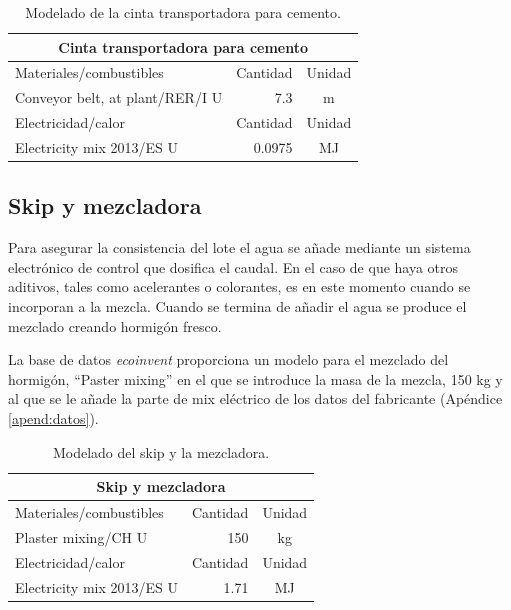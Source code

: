 \begin{table}[!htb]
\centering
\begin{tabular}{p{8cm}rc}
\toprule
\multicolumn{3}{c}{Cinta transportadora para cemento}\\
\midrule
Materiales/combustibles & Cantidad & Unidad\\
\midrule
Conveyor belt, at plant/RER/I U & 7.3 & \si{m}\\
\midrule
Electricidad/calor & Cantidad & Unidad\\
\midrule
Electricity mix 2013/ES U & 0.0975 & \si{MJ}\\
\bottomrule
\end{tabular}
\caption{Modelado de la cinta transportadora para cemento.}
\label{modeladodecintacemento}
\end{table}

\subsection{Skip y mezcladora}

Para asegurar la consistencia del lote el agua se añade mediante un sistema electrónico de control que dosifica el caudal. En el caso de que haya otros aditivos, tales como acelerantes o colorantes, es en este momento cuando se incorporan a la mezcla. Cuando se termina de añadir el agua se produce el mezclado creando hormigón fresco.

La base de datos \textit{ecoinvent} proporciona un modelo para el mezclado del hormigón, ``Paster mixing'' en el que se introduce la masa de la mezcla, 150 \si{kg} y al que se le añade la parte de mix eléctrico de los datos del fabricante (Apéndice \ref{apend:datos}).

\begin{table}[!htb]
\centering
\begin{tabular}{p{8cm}rc}
\toprule
\multicolumn{3}{c}{Skip y mezcladora}\\
\midrule
Materiales/combustibles & Cantidad & Unidad\\
\midrule
Plaster mixing/CH U & 150 & \si{kg}\\
\midrule
Electricidad/calor & Cantidad & Unidad\\
\midrule
Electricity mix 2013/ES U & 1.71 & \si{MJ}\\
\bottomrule
\end{tabular}
\caption{Modelado del skip y la mezcladora.}
\label{modeladoskip}
\end{table}

